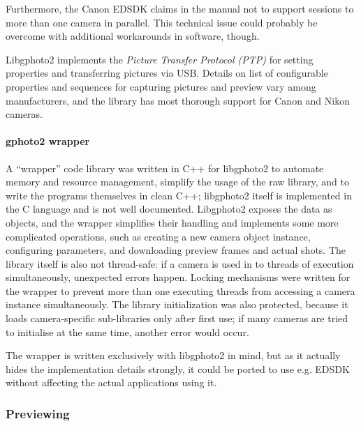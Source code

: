 Furthermore, the Canon EDSDK claims in the manual not to support sessions to more than one camera in parallel. \cite{canonedsdk}
This technical issue could probably be overcome with additional workarounds in software, though.

Libgphoto2 implements the \emph{Picture Transfer Protocol (PTP)} \cite{ptpTODO} for setting properties and transferring pictures via USB.
Details on list of configurable properties and sequences for capturing pictures and preview vary among manufacturers, and the library has most thorough support for Canon and Nikon cameras.

\paragraph{gphoto2 wrapper}
A ``wrapper'' code library was written in C++ for libgphoto2 to automate memory and resource management, simplify the usage of the raw library, and to write the programs themselves in clean C++; libgphoto2 itself is implemented in the C language and is not well documented.
Libgphoto2 exposes the data as objects, and the wrapper simplifies their handling and implements some more complicated operations, such as creating a new camera object instance, configuring parameters, and downloading preview frames and actual shots.
The library itself is also not thread-safe: if a camera is used in to threads of execution simultaneously, unexpected errors happen. \cite{gphoto2}
Locking mechanisms were written for the wrapper to prevent more than one executing threads from accessing a camera instance simultaneously.
The library initialization was also protected, because it loads camera-specific sub-libraries only after first use; if many cameras are tried to initialise at the same time, another error would occur.

The wrapper is written exclusively with libgphoto2 in mind, but as it actually hides the implementation details strongly, it could be ported to use e.g. EDSDK without affecting the actual applications using it.


\subsubsection{Previewing} %


